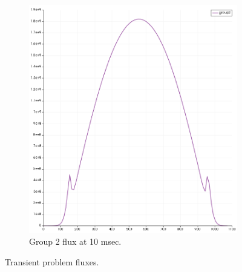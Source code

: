 \documentclass[11pt,letterpaper]{article}
\begin{document}
\begin{figure}[htbp!]
\begin{subfigure}[t]{0.4\textwidth}
			\includegraphics[width=\linewidth]{1D-fuel-reflec-g2}
			\caption{Group 2 flux at 10 msec.}
		\end{subfigure}
		\hfill
		\caption{Transient problem fluxes.}
		\label{fig:1D-fuel-reflec}
	\end{figure}

\pagebreak

% 
\end{document}
